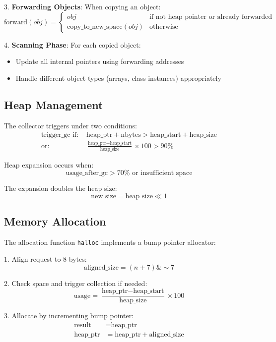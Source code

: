 \documentclass[12pt, a4paper]{article}
\begin{document}
3. \textbf{Forwarding Objects}: When copying an object:
   \[
   \text{forward}(obj) = \begin{cases}
   obj & \text{if not heap pointer or already forwarded} \\
   \text{copy\_to\_new\_space}(obj) & \text{otherwise}
   \end{cases}
   \]

4. \textbf{Scanning Phase}: For each copied object:
   \begin{itemize}
   \item Update all internal pointers using forwarding addresses
   \item Handle different object types (arrays, class instances) appropriately
   \end{itemize}

\subsection{Heap Management}
The collector triggers under two conditions:
\[
\begin{aligned}
\text{trigger\_gc if: } & \text{heap\_ptr} + \text{nbytes} > \text{heap\_start} + \text{heap\_size} \\
\text{or: } & \frac{\text{heap\_ptr} - \text{heap\_start}}{\text{heap\_size}} \times 100 > 90\%
\end{aligned}
\]

Heap expansion occurs when:
\[
\text{usage\_after\_gc} > 70\% \text{ or insufficient space}
\]

The expansion doubles the heap size:
\[
\text{new\_size} = \text{heap\_size} \ll 1
\]

\subsection{Memory Allocation}
The allocation function \texttt{halloc} implements a bump pointer allocator:

1. Align request to 8 bytes:
   \[
   \text{aligned\_size} = (n + 7) \& \sim7
   \]

2. Check space and trigger collection if needed:
   \[
   \text{usage} = \frac{\text{heap\_ptr} - \text{heap\_start}}{\text{heap\_size}} \times 100
   \]

3. Allocate by incrementing bump pointer:
   \[
   \begin{aligned}
   \text{result} &= \text{heap\_ptr} \\
   \text{heap\_ptr} &= \text{heap\_ptr} + \text{aligned\_size}
   \end{aligned}
   \]
\end{document}
